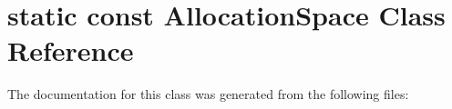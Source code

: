 \hypertarget{classstatic_01const_01AllocationSpace}{}\section{static const Allocation\+Space Class Reference}
\label{classstatic_01const_01AllocationSpace}


The documentation for this class was generated from the following files\+: